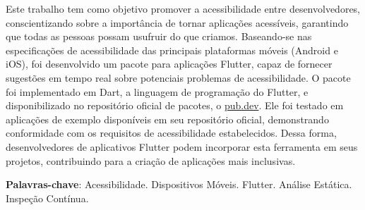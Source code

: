 
\setlength{\absparsep}{18pt} %
\begin{resumo}

  Este trabalho tem como objetivo promover a acessibilidade entre desenvolvedores, conscientizando sobre a importância de tornar aplicações acessíveis, garantindo que todas as pessoas possam usufruir do que criamos. Baseando-se nas especificações de acessibilidade das principais plataformas móveis (Android e iOS), foi desenvolvido um pacote para aplicações Flutter, capaz de fornecer sugestões em tempo real sobre potenciais problemas de acessibilidade. O pacote foi implementado em Dart, a linguagem de programação do Flutter, e disponibilizado no repositório oficial de pacotes, o \href{https://pub.dev}{pub.dev}. Ele foi testado em aplicações de exemplo disponíveis em seu repositório oficial, demonstrando conformidade com os requisitos de acessibilidade estabelecidos. Dessa forma, desenvolvedores de aplicativos Flutter podem incorporar esta ferramenta em seus projetos, contribuindo para a criação de aplicações mais inclusivas.

  \textbf{Palavras-chave}: Acessibilidade. Dispositivos Móveis. Flutter. Análise Estática. Inspeção Contínua.
\end{resumo}

